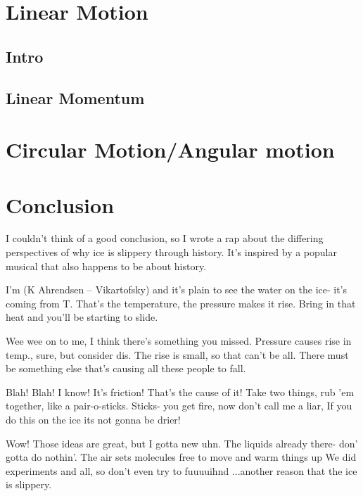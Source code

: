 \documentclass[12pt]{article}
\begin{document}
\section{Linear Motion}
\subsection{Intro}
\subsection{Linear Momentum}
\section{Circular Motion/Angular motion}

\section{Conclusion}
I couldn't think of a good conclusion, so I wrote a rap
about the differing perspectives of why ice is slippery 
through history. It's inspired by a popular musical that
also happens to be about history.

I'm (K Ahrendsen -- Vikartofsky) and it's plain to see 
the water on the ice- it's coming from T.
That's the temperature, the pressure makes it rise. 
Bring in that heat and you'll be starting to slide. 

Wee wee on to me, I think there's something you missed.
Pressure causes rise in temp., sure, but consider dis.
The rise is small, so that can't be all. 
There must be something else that's causing all these people to fall. 

Blah! Blah! I know! It's friction! That's the cause of it!
Take two things, rub 'em together, like a pair-o-sticks.
Sticks- you get fire, now don't call me a liar,
If you do this on the ice its not gonna be drier!

Wow! Those ideas are great, but I gotta new uhn.
The liquids already there- don' gotta do nothin'.
The air sets molecules free to move and warm things up
We did experiments and all, so don't even try to fuuuuihnd
...another reason that the ice is slippery.
\end{document}
